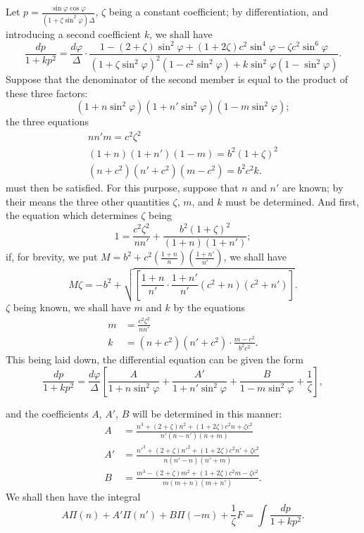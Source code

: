 \documentclass{article}
\begin{document}
Let $p=\frac{\sin\varphi\cos\varphi}{(1+\zeta\sin^{2}\varphi)\Delta}$, $\zeta$ being a constant coefficient; by differentiation, and introducing a second coefficient $k$, we shall have
\[ \frac{dp}{1+kp^{2}}=\frac{d\varphi}{\Delta}\cdot\frac{1-(2+\zeta)\sin^{2}\varphi+(1+2\zeta)c^{2}\sin^{4}\varphi-\zeta c^{2}\sin^{6}\varphi}{(1+\zeta\sin^{2}\varphi)^{2}(1-c^{2}\sin^{2}\varphi)+k\sin^{2}\varphi(1-\sin^{2}\varphi)}. \]
Suppose that the denominator of the second member is equal to the product of these three factors:
\[ (1+n\sin^{2}\varphi)(1+n'\sin^{2}\varphi)(1-m\sin^{2}\varphi); \]
the three equations
\[ \begin{gathered} nn'm=c^{2}\zeta^{2}\\ (1+n)(1+n')(1-m)=b^{2}(1+\zeta)^{2}\\ (n+c^{2})(n'+c^{2})(m-c^{2})=b^{2}c^{2}k. \end{gathered} \]
must then be satisfied. For this purpose, suppose that $n$ and $n'$ are known; by their means the three other quantities $\zeta$, $m$, and $k$ must be determined. And first, the equation which determines $\zeta$ being
\[ 1=\frac{c^{2}\zeta^{2}}{nn'}+\frac{b^{2}(1+\zeta)^{2}}{(1+n)(1+n')}; \]
if, for brevity, we put $M=b^{2}+c^{2}\left(\frac{1+n}{n}\right)\left(\frac{1+n'}{n'}\right)$, we shall have
\[ M\zeta=-b^{2}+\sqrt{\left[\frac{1+n}{n'}\cdot\frac{1+n'}{n'}(c^{2}+n)(c^{2}+n')\right]}. \]
$\zeta$ being known, we shall have $m$ and $k$ by the equations
\[ \begin{aligned} m&=\frac{c^{2}\zeta^{2}}{nn'}\\ k&=(n+c^{2})(n'+c^{2})\cdot\frac{m-c^{2}}{b^{2}c^{2}}. \end{aligned} \]
This being laid down, the differential equation can be given the form
\[ \frac{dp}{1+kp^{2}}=\frac{d\varphi}{\Delta}\left[\frac{A}{1+n\sin^{2}\varphi}+\frac{A'}{1+n'\sin^{2}\varphi}+\frac{B}{1-m\sin^{2}\varphi}+\frac{1}{\zeta}\right], \]

and the coefficients $A$, $A'$, $B$ will be determined in this manner:
\[ \begin{aligned} A&=\frac{n^{3}+(2+\zeta)n^{2}+(1+2\zeta)c^{2}n+\zeta c^{2}}{n'(n-n')(n+m)}\\ A'&=\frac{n'^{3}+(2+\zeta)n'^{2}+(1+2\zeta)c^{2}n'+\zeta c^{2}}{n(n'-n)(n'+m)}\\ B&=\frac{m^{3}-(2+\zeta)m^{2}+(1+2\zeta)c^{2}m-\zeta c^{2}}{m(m+n)(m+n')}. \end{aligned} \]
We shall then have the integral
\[ A\Pi(n)+A'\Pi(n')+B\Pi(-m)+\frac{1}{\zeta}F=\int\frac{dp}{1+kp^{2}}. \]
\end{document}
